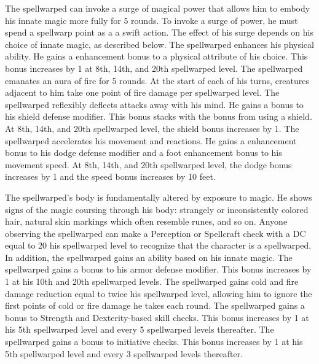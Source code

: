  The spellwarped can invoke a surge of magical power that allows him to embody his innate magic more fully for 5 rounds. To invoke a surge of power, he must spend a spellwarp point as a a swift action. The effect of his surge depends on his choice of innate magic, as described below.
 The spellwarped enhances his physical ability. He gains a  enhancement bonus to a physical attribute of his choice. This bonus increases by 1 at 8th, 14th, and 20th spellwarped level.
 The spellwarped emanates an aura of fire for 5 rounds. At the start of each of his turns, creatures adjacent to him take one point of fire damage per spellwarped level.
 The spellwarped reflexibly deflects attacks away with his mind. He gains a  bonus to his shield defense modifier. This bonus stacks with the bonus from using a shield. At 8th, 14th, and 20th spellwarped level, the shield bonus increases by 1.
 The spellwarped accelerates his movement and reactions. He gains a  enhancement bonus to his dodge defense modifier and a  foot enhancement bonus to his movement speed. At 8th, 14th, and 20th spellwarped level, the dodge bonus increases by 1 and the speed bonus increases by 10 feet.

 The spellwarped's body is fundamentally altered by exposure to magic. He shows signs of the magic coursing through his body: strangely or inconsistently colored hair, natural skin markings which often resemble runes, and so on. Anyone observing the spellwarped can make a Perception or Spellcraft check with a DC equal to 20 \sub his spellwarped level to recognize that the character is a spellwarped. In addition, the spellwarped gains an ability based on his innate magic.
 The spellwarped gains a  bonus to his armor defense modifier. This bonus increases by 1 at his 10th and 20th spellwarped levels.
 The spellwarped gains cold and fire damage reduction equal to twice his spellwarped level, allowing him to ignore the first points of cold or fire damage he takes each round.
 The spellwarped gains a  bonus to Strength and Dexterity-based skill checks. This bonus increases by 1 at his 5th spellwarped level and every 5 spellwarped levels thereafter.
 The spellwarped gains a  bonus to initiative checks. This bonus increases by 1 at his 5th spellwarped level and every 3 spellwarped levels thereafter.

